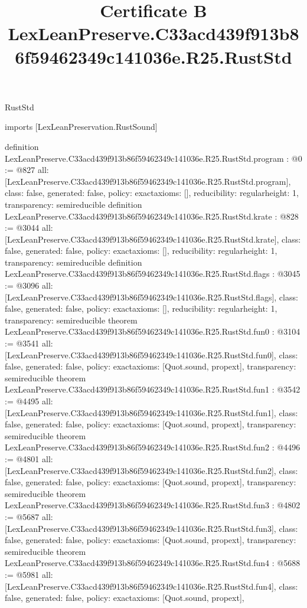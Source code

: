 \begin{lexlean}{RustStd}
\title{Certificate B LexLeanPreserve.C33acd439f913b86f59462349c141036e.R25.RustStd}
\begin{coremodule}
imports [LexLeanPreservation.RustSound]

definition LexLeanPreserve.C33acd439f913b86f59462349c141036e.R25.RustStd.program : @0 := @827 {
  all: [LexLeanPreserve.C33acd439f913b86f59462349c141036e.R25.RustStd.program],
  class: false,
  generated: false,
  policy: exact{axioms: []},
  reducibility: regular{height: 1},
  transparency: semireducible
}
definition LexLeanPreserve.C33acd439f913b86f59462349c141036e.R25.RustStd.krate : @828 := @3044 {
  all: [LexLeanPreserve.C33acd439f913b86f59462349c141036e.R25.RustStd.krate],
  class: false,
  generated: false,
  policy: exact{axioms: []},
  reducibility: regular{height: 1},
  transparency: semireducible
}
definition LexLeanPreserve.C33acd439f913b86f59462349c141036e.R25.RustStd.flags : @3045 := @3096 {
  all: [LexLeanPreserve.C33acd439f913b86f59462349c141036e.R25.RustStd.flags],
  class: false,
  generated: false,
  policy: exact{axioms: []},
  reducibility: regular{height: 1},
  transparency: semireducible
}
theorem LexLeanPreserve.C33acd439f913b86f59462349c141036e.R25.RustStd.fun0 : @3104 := @3541 {
  all: [LexLeanPreserve.C33acd439f913b86f59462349c141036e.R25.RustStd.fun0],
  class: false,
  generated: false,
  policy: exact{axioms: [Quot.sound, propext]},
  transparency: semireducible
}
theorem LexLeanPreserve.C33acd439f913b86f59462349c141036e.R25.RustStd.fun1 : @3542 := @4495 {
  all: [LexLeanPreserve.C33acd439f913b86f59462349c141036e.R25.RustStd.fun1],
  class: false,
  generated: false,
  policy: exact{axioms: [Quot.sound, propext]},
  transparency: semireducible
}
theorem LexLeanPreserve.C33acd439f913b86f59462349c141036e.R25.RustStd.fun2 : @4496 := @4801 {
  all: [LexLeanPreserve.C33acd439f913b86f59462349c141036e.R25.RustStd.fun2],
  class: false,
  generated: false,
  policy: exact{axioms: [Quot.sound, propext]},
  transparency: semireducible
}
theorem LexLeanPreserve.C33acd439f913b86f59462349c141036e.R25.RustStd.fun3 : @4802 := @5687 {
  all: [LexLeanPreserve.C33acd439f913b86f59462349c141036e.R25.RustStd.fun3],
  class: false,
  generated: false,
  policy: exact{axioms: [Quot.sound, propext]},
  transparency: semireducible
}
theorem LexLeanPreserve.C33acd439f913b86f59462349c141036e.R25.RustStd.fun4 : @5688 := @5981 {
  all: [LexLeanPreserve.C33acd439f913b86f59462349c141036e.R25.RustStd.fun4],
  class: false,
  generated: false,
  policy: exact{axioms: [Quot.sound, propext]},
}
\end{coremodule}
\end{lexlean}
